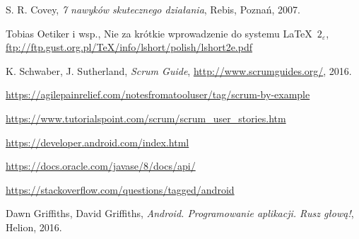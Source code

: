 \documentclass[a4paper]{article}
\begin{document}
\begin{thebibliography}{9}

 S. R. Covey, {\em 7 nawyków skutecznego działania}, Rebis, Poznań, 2007.

 Tobias Oetiker i wsp., Nie za krótkie wprowadzenie do systemu \LaTeX  \ $2_\varepsilon$, \url{ftp://ftp.gust.org.pl/TeX/info/lshort/polish/lshort2e.pdf}

 K. Schwaber, J. Sutherland, {\em Scrum Guide}, \url{http://www.scrumguides.org/}, 2016.

 \url{https://agilepainrelief.com/notesfromatooluser/tag/scrum-by-example}

 \url{https://www.tutorialspoint.com/scrum/scrum_user_stories.htm}

 \url{https://developer.android.com/index.html}

 \url{https://docs.oracle.com/javase/8/docs/api/}

 \url{https://stackoverflow.com/questions/tagged/android}

 Dawn Griffiths, David Griffiths, {\em Android. Programowanie aplikacji. Rusz głową!}, Helion, 2016.

\end{thebibliography}
\end{document}
